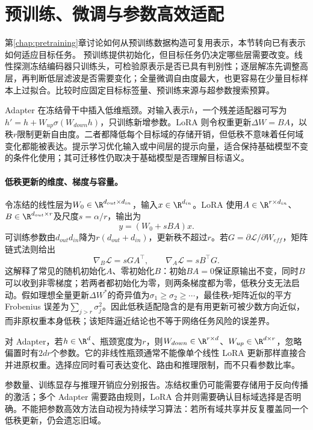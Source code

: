 \section{预训练、微调与参数高效适配}
第\ref{chap:pretraining}章讨论如何从预训练数据构造可复用表示，本节转向已有表示如何适应目标任务。
预训练提供初始化，但目标任务仍决定哪些层需要改变。线性探测冻结编码器只训练头，可检验原表示是否已具有判别性；逐层解冻先调整高层，再判断低层滤波是否需要变化；全量微调自由度最大，也更容易在少量目标样本上过拟合。比较时应固定目标标签量、预训练来源与超参数搜索预算。

Adapter 在冻结骨干中插入低维瓶颈。对输入表示$h$，一个残差适配器可写为$h'=h+W_{up}\sigma(W_{down}h)$，只训练新增参数\cite{houlsby2019adapter}。LoRA 则令权重更新$\Delta W=BA$，以秩$r$限制更新自由度\cite{hu2021lora}。二者都降低每个目标域的存储开销，但低秩不意味着任何域变化都能被表达。提示学习优化输入或中间层的提示向量，适合保持基础模型不变的条件化使用；其可迁移性仍取决于基础模型是否理解目标语义。

\paragraph{低秩更新的维度、梯度与容量。}
令冻结的线性层为$W_0\in\R^{d_{out}\times d_{in}}$，输入$x\in\R^{d_{in}}$。LoRA 使用$A\in\R^{r\times d_{in}}$、$B\in\R^{d_{out}\times r}$及尺度$s=\alpha/r$，输出为
\begin{equation}
 y=(W_0+sBA)x.
\end{equation}
可训练参数由$d_{out}d_{in}$降为$r(d_{out}+d_{in})$，更新秩不超过$r$。若$G=\partial\mathcal L/\partial W_{eff}$，矩阵链式法则给出
\begin{equation}
 \nabla_B\mathcal L=sGA^\top,\qquad
 \nabla_A\mathcal L=sB^\top G.
\end{equation}
这解释了常见的随机初始化$A$、零初始化$B$：初始$BA=0$保证原输出不变，同时$B$可以收到非零梯度；若两者都初始化为零，则两条梯度都为零，低秩分支无法启动。假如理想全量更新$\Delta W^*$的奇异值为$\sigma_1\geq\sigma_2\geq\cdots$，最佳秩$r$矩阵近似的平方 Frobenius 误差为$\sum_{j>r}\sigma_j^2$。因此低秩适配隐含的是有用更新可被少数方向近似，而非原权重本身低秩；该矩阵逼近结论也不等于网络任务风险的误差界。

对 Adapter，若$h\in\R^d$、瓶颈宽度为$r$，则$W_{down}\in\R^{r\times d}$、$W_{up}\in\R^{d\times r}$，忽略偏置时有$2dr$个参数。它的非线性瓶颈通常不能像单个线性 LoRA 更新那样直接合并进原权重。选择应同时看可表达变化、路由和推理限制，而不只看参数比率。

参数量、训练显存与推理开销应分别报告。冻结权重仍可能需要存储用于反向传播的激活；多个 Adapter 需要路由规则，LoRA 合并则需要确认目标域选择是否明确。不能把参数高效方法自动视为持续学习算法：若所有域共享并反复覆盖同一个低秩更新，仍会遗忘旧域。

